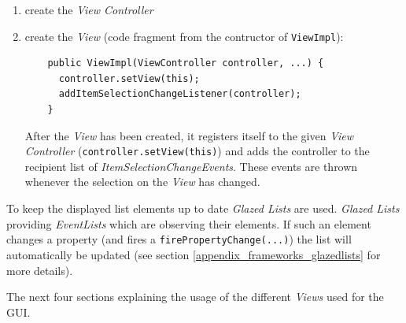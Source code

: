\begin{enumerate}
\item create the \textit{View Controller}
\item create the \textit{View} (code fragment from the contructor of \texttt{ViewImpl}):
  \begin{verbatim}
    public ViewImpl(ViewController controller, ...) {
      controller.setView(this);
      addItemSelectionChangeListener(controller);
    }
  \end{verbatim}
  After the \textit{View} has been created, it registers itself to the given \textit{View Controller} (\texttt{controller.setView(this)}) and adds the controller to the recipient list of \textit{ItemSelectionChangeEvents}. These events are thrown whenever the selection on the \textit{View} has changed.
\end{enumerate}
To keep the displayed list elements up to date \textit{Glazed Lists} are used. \textit{Glazed Lists} providing \textit{EventLists} which are observing their elements. If such an element changes a property (and fires a \texttt{firePropertyChange(...)}) the list will automatically be updated (see section \ref{appendix_frameworks_glazedlists} for more details).

The next four sections explaining the usage of the different \textit{Views} used for the GUI.

